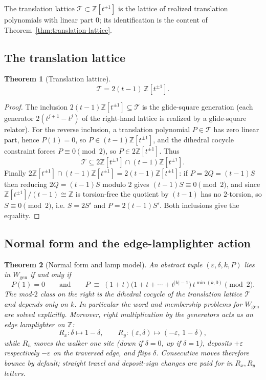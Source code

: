 \documentclass[11pt]{article}
\theoremstyle{plain}
\newtheorem{theorem}{Theorem}
\theoremstyle{definition}
\theoremstyle{remark}
\begin{document}
The translation lattice $\mathcal{T}\subset\mathbb{Z}[t^{\pm1}]$ is the lattice
of realized translation polynomials with linear part $0$; its identification is
the content of Theorem~\ref{thm:translation-lattice}.

\subsection{The translation lattice}

\begin{theorem}[Translation lattice]
\label{thm:translation-lattice-restate}
\[
\mathcal{T}=2(t-1)\,\mathbb{Z}[t^{\pm1}].
\]
\end{theorem}

\begin{proof}
The inclusion $2(t-1)\mathbb{Z}[t^{\pm1}]\subseteq\mathcal{T}$ is the
glide-square generation (each generator $2(t^{j+1}-t^j)$ of the right-hand
lattice is realized by a glide-square relator). For the reverse inclusion, a
translation polynomial $P\in\mathcal{T}$ has zero linear part, hence
$P(1)=0$, so $P\in(t-1)\mathbb{Z}[t^{\pm1}]$, and the dihedral cocycle
constraint forces $P\equiv0\pmod 2$, so $P\in2\mathbb{Z}[t^{\pm1}]$. Thus
\[
\mathcal{T}\subseteq
2\mathbb{Z}[t^{\pm1}]\cap(t-1)\mathbb{Z}[t^{\pm1}].
\]
Finally
$2\mathbb{Z}[t^{\pm1}]\cap(t-1)\mathbb{Z}[t^{\pm1}]
=2(t-1)\mathbb{Z}[t^{\pm1}]$: if $P=2Q=(t-1)S$ then reducing
$2Q=(t-1)S$ modulo $2$ gives $(t-1)S\equiv0\pmod2$, and since
$\mathbb{Z}[t^{\pm1}]/(t-1)\cong\mathbb{Z}$ is torsion-free the quotient by
$(t-1)$ has no $2$-torsion, so $S\equiv0\pmod2$, i.e. $S=2S'$ and
$P=2(t-1)S'$. Both inclusions give the equality.
\end{proof}

\subsection{Normal form and the edge-lamplighter action}

\begin{theorem}[Normal form and lamp model]
\label{thm:normal-form}
An abstract tuple $(\varepsilon,\delta,k,P)$ lies in $W_{\mathrm{gen}}$ if and
only if
\[
P(1)=0
\qquad\text{and}\qquad
P \;\equiv\; (1+t)\bigl(1+t+\cdots+t^{|k|-1}\bigr)\,t^{\min(k,0)} \pmod 2 .
\]
The mod-$2$ class on the right is the dihedral cocycle of the translation
lattice $\mathcal{T}$ and depends only on $k$. In particular the word and
membership problems for $W_{\mathrm{gen}}$ are solved explicitly. Moreover,
right multiplication by the generators acts as an \emph{edge lamplighter} on
$\mathbb{Z}$:
\[
R_x \colon \delta \mapsto 1-\delta,
\qquad
R_y \colon (\varepsilon,\delta)\mapsto(-\varepsilon,\,1-\delta),
\]
while $R_h$ moves the walker one site (down if $\delta=0$, up if $\delta=1$),
deposits $+\varepsilon$ respectively $-\varepsilon$ on the traversed edge, and
flips $\delta$. Consecutive moves therefore bounce by default; straight travel
and deposit-sign changes are paid for in $R_x,R_y$ letters.
\end{theorem}
\end{document}
